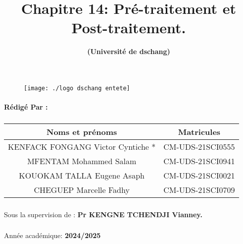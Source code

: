 \documentclass[a4paper, 12pt]{article}
\title{{\Large \textbf{Chapitre 14: Pré-traitement et Post-traitement.}}}
\author{ \textbf{(Université de dschang)}}
\begin{document}
	\setlength{\arrayrulewidth}{0.5mm}   %
	\setlength{\tabcolsep}{12pt}          %
	\renewcommand{\arraystretch}{1.5} 
	
	\justifying
	
	
	\begin{center}
		\begin{figure}
			\begin{center}
				\texttt{[image: ./logo dschang entete]}
			\end{center}
		\end{figure}
		\maketitle
		\paragraph{Rédigé Par :} 
		\subparagraph{}
			\centering
			\begin{tabular}	{|c|c|}
				\hline \rowcolor{cyan} \textbf{{\large Noms et prénoms}} & \textbf{{\large Matricules}}\\ \hline
				{KENFACK FONGANG Victor Cyntiche *} & CM-UDS-21SCI0555\\
				\hline
				{MFENTAM Mohammed Salam} & CM-UDS-21SCI0941\\
				\hline
				{KOUOKAM TALLA Eugene Asaph} & CM-UDS-21SCI0021\\
				\hline
				{CHEGUEP Marcelle Fadhy} & CM-UDS-21SCI0709\\
				\hline
			\end{tabular}
		 \subparagraph{ } Sous la supervision de :  \textbf{Pr KENGNE TCHENDJI Vianney.}
		\subparagraph{} Année académique: \textbf{2024/2025}
	\end{center}
\begin{center}
		

\end{center}
	
	\thispagestyle{empty}
	\newpage
	
	\tableofcontents
	\newpage
	\listoffigures
	\newpage
\end{document}
